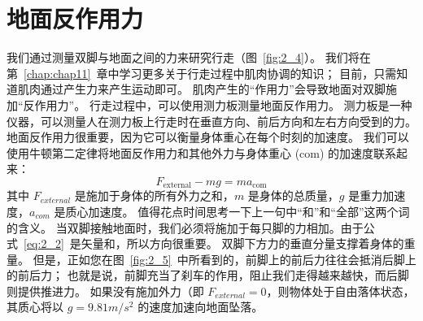 \section{地面反作用力}

我们通过测量双脚与地面之间的力来研究行走（图~\ref{fig:2_4}）。
我们将在第~\ref{chap:chap11}~章中学习更多关于行走过程中肌肉协调的知识；
目前，只需知道肌肉通过产生力来产生运动即可。
肌肉产生的“作用力”会导致地面对双脚施加“反作用力”。
行走过程中，可以使用测力板测量地面反作用力。
测力板是一种仪器，可以测量人在测力板上行走时在垂直方向、前后方向和左右方向受到的力。​​
地面反作用力很重要，因为它可以衡量身体重心在每个时刻的加速度。
我们可以使用牛顿第二定律将地面反作用力和其他外力与身体重心 (com) 的加速度联系起来：
\begin{equation}
	F_{\text{external}} - mg = m a_{\text{com}} \label{eq:2_2}
\end{equation}
其中 $F_{external}$ 是施加于身体的所有外力之和，$m$ 是身体的总质量，$g$ 是重力加速度，$a_{com}$ 是质心加速度。
值得花点时间思考一下上一句中“和”和“全部”这两个词的含义。
当双脚接触地面时，我们必须将施加于每只脚的力相加。由于公式~\ref{eq:2_2}~是矢量和，所以方向很重要。
双脚下方力的垂直分量支撑着身体的重量。
但是，正如您在图~\ref{fig:2_5}~中所看到的，前脚上的前后力往往会抵消后脚上的前后力；
也就是说，前脚充当了刹车的作用，阻止我们走得越来越快，而后脚则提供推进力。
如果没有施加外力（即 $F_{external} = 0$，则物体处于自由落体状态，其质心将以 $g = 9.81 m/s^2$ 的速度加速向地面坠落。



